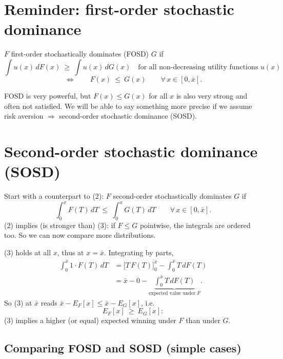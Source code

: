 \documentclass[11pt]{article}
\begin{document}


\section{Reminder: first-order stochastic dominance}

$F$ first-order stochastically dominates (FOSD) $G$ if
\[ \int u(x)\,dF(x)\ \ge\ \int u(x)\,dG(x)
   \quad\text{for all non-decreasing utility functions } u(x) \tag{1} \]
\[ \Longleftrightarrow\qquad F(x)\ \le\ G(x) \qquad \forall\, x\in[0,\bar x]. \tag{2} \]

FOSD is very powerful, but $F(x)\le G(x)$ for all $x$ is also very strong and often not
satisfied. We will be able to say something more precise if we assume risk aversion
$\Rightarrow$ second-order stochastic dominance (SOSD).


\section{Second-order stochastic dominance (SOSD)}

Start with a counterpart to (2): $F$ second-order stochastically dominates $G$ if
\[ \int_0^{x} F(T)\,dT\ \le\ \int_0^{x} G(T)\,dT \qquad \forall\, x\in[0,\bar x]. \tag{3} \]
(2) implies (is stronger than) (3): if $F\le G$ pointwise, the integrals are ordered too.
So we can now compare more distributions.

(3) holds at all $x$, thus at $x=\bar x$. Integrating by parts,
\begin{align*}
  \int_0^{\bar x} 1\cdot F(T)\,dT
   &= \bigl[T\,F(T)\bigr]_0^{\bar x}-\int_0^{\bar x} T\,dF(T)\\
   &= \bar x - 0 - \underbrace{\int_0^{\bar x} T\,dF(T)}_{\text{expected value under } F}.
\end{align*}
So (3) at $\bar x$ reads $\bar x-E_F[x]\le \bar x-E_G[x]$, i.e.\
\[ E_F[x]\ \ge\ E_G[x]: \]
(3) implies a higher (or equal) expected winning under $F$ than under $G$.

\subsection*{Comparing FOSD and SOSD (simple cases)}
\end{document}
